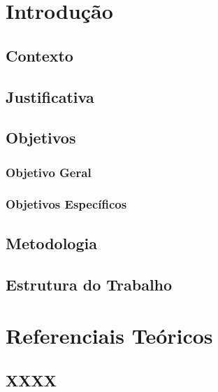 \documentclass[
	12pt,				%
	openright,			%
	oneside,			%
	a4paper,			%
	chapter=TITLE,		%
	english,			%
	french,				%
	spanish,			%
	brazil				%
	]{abntex2}
\theoremstyle{definition}
\begin{document}
\chapter{Introdução}
\label{cap:introducao}

\section{Contexto}

\section{Justificativa}

\section{Objetivos}

\subsection{Objetivo Geral}

\subsection{Objetivos Específicos}

\section{Metodologia}

\section{Estrutura do Trabalho}



\chapter{Referenciais Teóricos}
\label{cap:referenciais_teoricos}

\section{XXXX}
\end{document}
